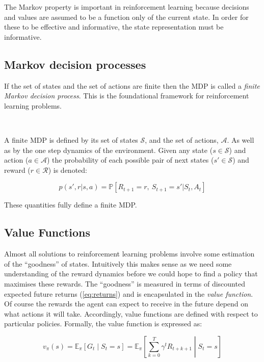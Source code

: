 \documentclass{article}
\begin{document}
 The Markov property is important in reinforcement learning because decisions and values are assumed to be a function only of the current state. In order for these to be effective and informative, the state representation must be informative. \citep{sutton2018reinforcement}

\subsection{Markov decision processes}

If the set of states and the set of actions are finite then the MDP is called a \textit{finite Markov decision process}. This is the foundational framework for reinforcement learning problems. 

\

A finite MDP is defined by its set of states $\mathcal{S}$, and the set of actions, $\mathcal{A}$. As well as by the one step dynamics of the environment. Given any state ($s \in \mathcal{S}$) and action ($a \in \mathcal{A}$) the probability of each possible pair of next states ($s' \in \mathcal{S}$) and reward ($r \in \mathcal{R}$) is denoted:

\begin{equation}
	p(s', r | s, a) = \mathbb{P}[ R_{t+1} = r, \ S_{t+1} = s' | S_t, A_t]
\end{equation}

These quantities fully define a finite MDP.

\subsection{Value Functions}

Almost all solutions to reinforcement learning problems involve some estimation of the ``goodness'' of states. Intuitively this makes sense as we need some understanding of the reward dynamics before we could hope to find a policy that maximises these rewards. The ``goodness'' is measured in terms of discounted expected future returns (\ref{eq:returns}) and is encapsulated in the \textit{value function}. Of course the rewards the agent can expect to receive in the future depend on what actions it will take. Accordingly, value functions are defined with respect to particular policies. Formally, the value function is expressed as:

\begin{equation}\label{eq:value_function}
	v_\pi(s) = \mathbb{E}_\pi\left[ G_t \middle| S_t = s \right] = \mathbb{E}_\pi\left[ \sum_{k=0}^T \gamma^t R_{t + k + 1} \middle| S_t = s \right]
\end{equation}
\end{document}
